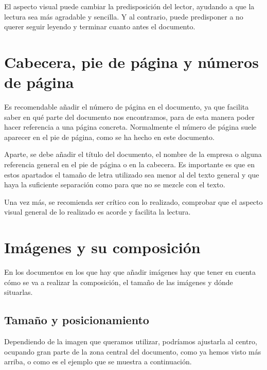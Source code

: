 El aspecto visual puede cambiar la predisposición del lector, ayudando a que la lectura sea más agradable y sencilla. Y al contrario, puede predisponer a no querer seguir leyendo y terminar cuanto antes el documento.

\vspace{10pt}


\section{Cabecera, pie de página y números de página}
Es recomendable añadir el número de página en el documento, ya que facilita saber en qué parte del documento nos encontramos, para de esta manera poder hacer referencia a una página concreta. Normalmente el número de página suele aparecer en el pie de página, como se ha hecho en este documento.

Aparte, se debe añadir el título del documento, el nombre de la empresa o alguna referencia general en el pie de página o en la cabecera. Es importante es que en estos apartados el tamaño de letra utilizado sea menor al del texto general y que haya la suficiente separación como para que no se mezcle con el texto.


Una vez más, se recomienda ser crítico con lo realizado, comprobar que el aspecto visual general de lo realizado es acorde y facilita la lectura.


\section{Imágenes y su composición}

En los documentos en los que hay que añadir imágenes hay que tener en cuenta cómo se va a realizar la composición, el tamaño de las imágenes y dónde situarlas.

\subsection{Tamaño y posicionamiento}
Dependiendo de la imagen que queramos utilizar, podríamos ajustarla al centro, ocupando gran parte de la zona central del documento, como ya hemos visto más arriba, o como es el ejemplo que se muestra a continuación.

